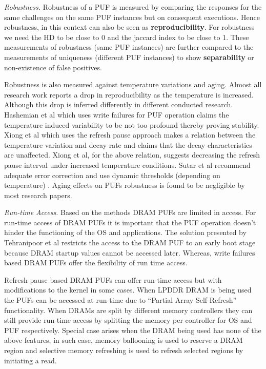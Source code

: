 \documentclass[journal, a4paper]{IEEEtran}
\begin{document}
\textit{Robustness.} Robustness of a PUF is measured by comparing the responses for the same challenges on the same PUF instances but on consequent executions. Hence robustness, in this context can also be seen as \textbf{reproducibility}. For robustness we need the HD to be close to 0 and the jaccard index to be close to 1. These measurements of robustness (same PUF instances) are further compared to the measurements of uniqueness (different PUF instances) to show \textbf{separability} or non-existence of false positives.

Robustness is also measured against temperature variations and aging. Almost all research work reports a drop in reproducibility as the temperature is increased. Although this drop is inferred differently in different conducted research. Hashemian et al which uses write failures for PUF operation claims the temperature induced variability to be not too profound thereby proving stability. Xiong et al which uses the refresh pause approach makes a relation between the temperature variation and decay rate and claims that the decay characteristics are unaffected. Xiong et al, for the above relation, suggests decreasing the refresh pause interval under increased temperature conditions. Sutar et al recommend adequate error correction and use dynamic thresholds (depending on temperature) . Aging effects on PUFs robustness is found to be negligible by most research papers.

\textit{Run-time Access.} Based on the methods DRAM PUFs are limited in access. For run-time access of DRAM PUFs it is important that the PUF operation doesn’t hinder the functioning of the OS and applications. The solution presented by Tehranipoor et al restricts the access to the DRAM PUF to an early boot stage because DRAM startup values cannot be accessed later. Whereas, write failures based DRAM PUFs offer the flexibility of run time access.

Refresh pause based  DRAM PUFs can offer run-time access but with modifications to the kernel in some cases. When LPDDR DRAM is being used the PUFs can be accessed at run-time due to “Partial Array Self-Refresh” functionality. \cite{SUT18} When DRAMs are split by different memory controllers they can still provide run-time access by splitting the memory per controller for OS and PUF respectively. Special case arises when the DRAM being used has none of the above features, in such case, memory ballooning is used to reserve a DRAM region and selective memory refreshing is used to refresh selected regions by initiating a read.\cite{XIO16}
\end{document}

